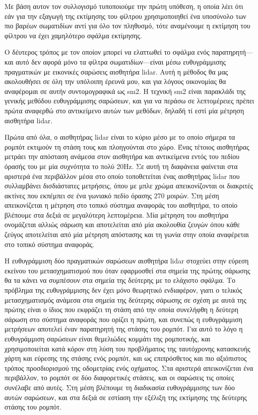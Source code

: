 \documentclass[a4paper,10pt]{article}
\begin{document}
Με βάση αυτον τον συλλογισμό τυποποιούμε την πρώτη υπόθεση, η οποία λέει ότι
εάν για την εξαγωγή της εκτίμησης του φίλτρου χρησιμοποιηθεί ένα υποσύνολο των
πιο βαρέων σωματιδίων αντί για όλο τον πληθυσμό, τότε αναμένουμε η εκτίμηση
του φίλτρου να έχει χαμηλότερο σφάλμα εκτίμησης.


Ο δέυτερος τρόπος με τον οποίον μπορεί να ελαττωθεί το σφάλμα ενός
παρατηρητή---και αυτό δεν αφορά μόνο τα φίλτρα σωματιδίων---είναι μέσω
ευθυγράμμισης πραγματικών με εικονικές σαρώσεις αισθητήρα lidar. Αυτή η μέθοδος
θα μας ακολουθήσει σε όλη την υπόλοιπη έρευνά μου, και για λόγους οικονομίας θα
αναφέρομαι σε αυτήν συντομογραφικά ως sm2. Η τεχνική sm2 είναι παρακλάδι της
γενικής μεθόδου ευθυγράμμισης σαρώσεων, και για να περάσω σε λεπτομέρειες
πρέπει πρώτα αναφερθώ στο αντικείμενο αυτών των μεθόδων, δηλαδή τί εστί μία
μέτρηση αισθητήρα lidar.

Πρώτα από όλα, ο αισθητήρας lidar είναι το κύριο μέσο με το οποίο σήμερα τα
ρομπότ εκτιμούν τη στάση τους και πλοηγούνται στο χώρο. Ένας τέτοιος αισθητήρας
μετράει την απόσταση ανάμεσα στον αισθητήρα και αντικείμενα εντός του πεδίου
όρασής του με μία συχνότητα το πολύ 20Hz.  Σε αυτή τη διαφάνεια φαίνεται στα
αριστερά ένα περιβάλλον μέσα στο οποίο τοποθετείται ένας αισθητήρας lidar που
συλλαμβάνει δισδιάστατες μετρήσεις, όπου με μπλε χρώμα απεικονίζονται οι
διακριτές ακτίνες που εκπέμπει σε ένα γωνιακό πεδίο όρασης 270 μοιρών. Στη μέση
απεικονίζεται η μέτρηση στο τοπικό σύστημα αναφοράς του αισθητήρα, το οποίο
βλέπουμε στα δεξιά σε μεγαλύτερη λεπτομέρεια. Μία μέτρηση του αισθητήρα
ονομάζεται αλλιώς σάρωση και αποτελείται από μία ακολουθία ζευγών όπου κάθε
ζεύγος αποτελείται από μία μέτρηση απόστασης και τη γωνία στην οποία αναφέρεται
στο τοπικό σύστημα αναφοράς.

Η ευθυγράμμιση δύο πραγματικών σαρώσεων αισθητήρα lidar στοχεύει στην εύρεση
εκείνου του μετασχηματισμού που όταν εφαρμοσθεί στα σημεία της πρώτης σάρωσης
θα τα κάνει να συμπέσουν στα σημεία της δεύτερης με το ελάχιστο σφάλμα. Το
πρόβλημα της ευθυγράμμισης δεν έχει μόνο θεωρητικό ενδιαφέρον, γιατι ο τελικός
μετασχηματισμός ανάμεσα στα σημεία της δεύτερης σάρωσης σε σχέση με αυτά της
πρώτης είναι ο ίδιος που εκφράζει τη στάση από την οποία συνελήφθη η δεύτερη
σάρωση στο σύστημα αναφοράς που ορίζει η πρώτη, και συνεπώς η ευθυγράμμιση
μετρήσεων αποτελεί έναν παρατηρητή της στάσης του ρομπότ. Για αυτό το
λόγο η ευθυγράμμιση σαρώσεων είναι θεμελιώδες κομμάτι της ρομποτικής, και
χρησιμοποιείται κατά κόρον στη λύση του προβλήματος της ταυτόχρονης κατασκευής
χάρτη και εύρεσης της στάσης ενός ρομπότ, και ως επιπρόσθετος και πιο
αξιόπιστος τρόπος προσδιορισμού της οδομετρίας ενός οχήματος.  Στα
αριστερά απεικονίζεται ένα περιβάλλον, το ρομπότ σε δύο διαφορετικές στάσεις,
και οι σαρώσεις τις οποίες συνέλαβε από αυτές. Στη μέση βλέπουμε τη διαδικασία
ευθυγράμμισης των δύο αυτών σαρώσεων, και στα δεξιά σε εστίαση την εξέλιξη της
εκτίμησης της δεύτερης στάσης του ρομπότ.
\end{document}
